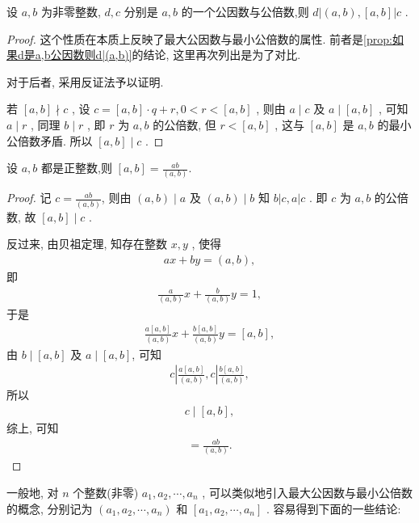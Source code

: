 \begin{property}
	设 $a ,  b$ 为非零整数, $d ,  c$ 分别是 $a ,  b$ 的一个公因数与公倍数,则 $d|(a, b),[a, b]| c$ .
\end{property}
\begin{proof}	
这个性质在本质上反映了最大公因数与最小公倍数的属性. 前者是\autoref{prop:如果d是a,b公因数则d|(a,b)}的结论, 这里再次列出是为了对比.

对于后者, 采用反证法予以证明. 

若 $[a, b] \nmid c$ , 设 $c=[a, b] \cdot q+r, 0<r<[a, b]$ , 则由 $a \mid c$ 及 $a \mid[a, b]$ , 可知 $a \mid r$ , 同理 $b \mid r$ , 即 $r$ 为 $a ,  b$ 的公倍数, 但 $r<[a, b]$ , 这与 $[a, b]$ 是 $a ,  b$ 的最小公倍数矛盾. 所以 $[a, b] \mid c$ .
\end{proof}

\begin{property}\label{prop:最大公因数与最小公倍数的关系}
	设 $a ,  b$ 都是正整数,则 $[a, b]=\frac{a b}{(a, b)}$.
\end{property}
\begin{proof}
	记 $c=\frac{a b}{(a, b)}$, 则由 $(a, b) \mid a$ 及 $(a, b) \mid b$ 知 $b|c, a| c$ . 即 $c$ 为 $a ,  b$ 的公倍数, 故 $[a, b] \mid c$ .

反过来, 由贝祖定理, 知存在整数 $x ,  y$ , 使得
\begin{align*}
	a x+b y=(a, b),
\end{align*}
即
\begin{align*}
	\frac{a}{(a, b)} x+\frac{b}{(a, b)} y=1,
\end{align*}
于是
\begin{align*}
	\frac{a[a, b]}{(a, b)} x+\frac{b[a, b]}{(a, b)} y=[a, b],
\end{align*}
由 $b \mid[a, b]$ 及 $a \mid[a, b]$, 可知
\begin{align*}
	c\left|\frac{a[a, b]}{(a, b)}, c\right| \frac{b[a, b]}{(a, b)},
\end{align*}
所以
\begin{align*}
	c \mid[a, b],
\end{align*}
综上, 可知
\begin{align*}
	[a, b]=\frac{a b}{(a, b)}.
\end{align*}
\end{proof}

一般地, 对 $n$ 个整数(非零) $a_{1}, a_{2}, \cdots, a_{n}$ , 可以类似地引入最大公因数与最小公倍数的概念, 分别记为 $\left(a_{1}, a_{2}, \cdots, a_{n}\right)$ 和 $\left[a_{1}, a_{2}, \cdots, a_{n}\right]$ . 容易得到下面的一些结论:


